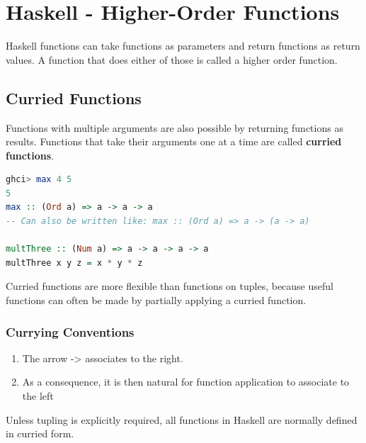 \hypertarget{haskell}{%
\section{Haskell - Higher-Order Functions}\label{haskell}}

Haskell functions can take functions as parameters and return functions as return values. A function that does either of those is called a higher order function.


\hypertarget{curried-functions}{%
\subsection{Curried Functions}\label{curried-functions}}

Functions with multiple arguments are also possible by returning
functions as results. Functions that take their arguments one at a time
are called \textbf{curried functions}.

\begin{lstlisting}[language=Haskell]
ghci> max 4 5  
5 
max :: (Ord a) => a -> a -> a
-- Can also be written like: max :: (Ord a) => a -> (a -> a)

multThree :: (Num a) => a -> a -> a -> a  
multThree x y z = x * y * z
\end{lstlisting}

Curried functions are more flexible than functions on tuples, because
useful functions can often be made by partially applying a curried
function.

\hypertarget{currying-conventions}{%
\subsubsection{Currying Conventions}\label{currying-conventions}}

\begin{enumerate}
\def\labelenumi{\arabic{enumi}.}
\tightlist
\item
  The arrow -\textgreater{} associates to the right.
\item
  As a consequence, it is then natural for function application to
  associate to the left
\end{enumerate}

\begin{tcolorbox}[colback=red!5!white,colframe=red!75!black]
Unless tupling is explicitly required, all functions in Haskell are normally defined in curried form.
\end{tcolorbox}

